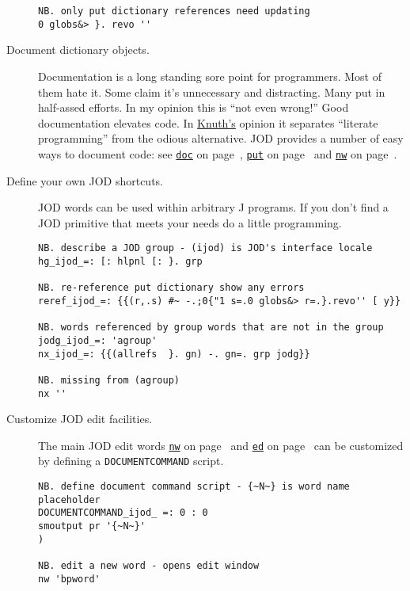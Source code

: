 \begin{description}
\begin{lstlisting}[frame=single,framerule=0pt]
NB. only put dictionary references need updating
0 globs&> }. revo ''
\end{lstlisting}
 
 
\item[Document dictionary objects.]  Documentation is a long standing sore point for programmers.  
Most of them hate it. Some claim it's unnecessary and distracting.  Many put in half-assed efforts. 
In my opinion this is ``not even wrong!''  Good documentation elevates code. In 
\href{https://www-cs-faculty.stanford.edu/~knuth/}{Knuth's} \cite{knuth:web} opinion it separates
``literate programming'' from the odious alternative.   JOD provides a number of easy ways to document code: see \hyperlink{il:doc}{\texttt{doc}} on page~\pageref{ss:doc}, 
\hyperlink{il:put}{\texttt{put}} on page~\pageref{ss:put} and \hyperlink{il:nw}{\texttt{nw}} on page~\pageref{ss:nw}.


\item[Define your own JOD shortcuts.]  JOD words can be used 
within arbitrary J programs.  If you don't find a JOD primitive that meets 
your needs do a little programming.

\begin{lstlisting}[frame=single,framerule=0pt]
NB. describe a JOD group - (ijod) is JOD's interface locale
hg_ijod_=: [: hlpnl [: }. grp
   
NB. re-reference put dictionary show any errors
reref_ijod_=: {{(r,.s) #~ -.;0{"1 s=.0 globs&> r=.}.revo'' [ y}}
   
NB. words referenced by group words that are not in the group
jodg_ijod_=: 'agroup'
nx_ijod_=: {{(allrefs  }. gn) -. gn=. grp jodg}}
   
NB. missing from (agroup)
nx ''
\end{lstlisting}
 

\item[Customize JOD edit facilities.]  The main JOD edit words \hyperlink{il:nw}{\texttt{nw}} on page~\pageref{ss:nw} and
 \hyperlink{il:ed}{\texttt{ed}} on page~\pageref{ss:ed} can be customized by defining a \texttt{DOCUMENTCOMMAND} script.

\begin{lstlisting}[frame=single,framerule=0pt]
NB. define document command script - {~N~} is word name placeholder
DOCUMENTCOMMAND_ijod_ =: 0 : 0
smoutput pr '{~N~}'
) 
   
NB. edit a new word - opens edit window
nw 'bpword'
\end{lstlisting}
 


\end{description}
